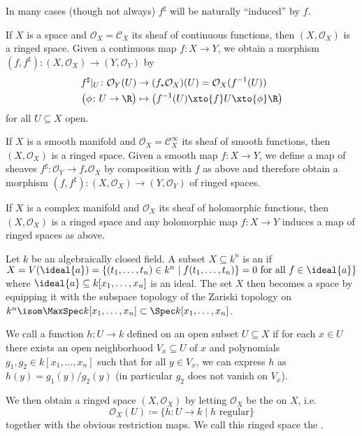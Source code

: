 \documentclass[wip, algebra]{bsteffan-lecturenotes}
\newcommand{\cO}{\mathcal{O}}
\newcommand{\cC}{\mathcal{C}}
\begin{document}
In many cases (though not always) $f^\sharp$ will be naturally \enquote{induced} by $f$.
\begin{example}\label{epl:sch:examples}
	\leavevmode
	\begin{alphanumerate}
		\item If $X$ is a space and $\cO_X = \cC_X$ its sheaf of continuous functions, then $(X, \cO_X)$ is a ringed space.
			Given a continuous map $f\colon X \to Y$, we obtain a morphism $(f, f^\sharp)\colon (X, \cO_X) \to (Y, \cO_Y)$ by 
			\begin{align*}
				f^\sharp|_U\colon \cO_Y(U) &\to (f_* \cO_X)(U) = \cO_X(f^{-1}(U)) \\
					\big(\phi\colon U \to \R\big) &\mapsto \big(f^{-1}(U) \xto{f} U \xto{\phi} \R\big)
			\end{align*}
			for all $U \subseteq X$ open.
		\item If $X$ is a smooth manifold and $\cO_X = \cC_X^\infty$ its sheaf of smooth functions, then $(X, \cO_X)$ is a ringed space.
			Given a smooth map $f\colon X \to Y$, we define a map of sheaves $f^\sharp\colon \cO_Y \to f_* \cO_X$ by composition with $f$ as above and therefore obtain a morphism $(f, f^\sharp)\colon (X, \cO_X) \to (Y, \cO_Y)$ of ringed spaces.
		\item If $X$ is a complex manifold and $\cO_X$ its sheaf of holomorphic functions, then $(X, \cO_X)$ is a ringed space and any holomorphic map $f\colon X \to Y$ induces a map of ringed spaces as above.
		\item Let $k$ be an algebraically closed field.
			A subset $X \subseteq k^n$ is an  if $X = V(\ideal{a}) = \{(t_1, \ldots, t_n) \in k^n \mid f(t_1, \ldots, t_n)\} = 0 \text{ for all } f \in \ideal{a}\}$ where $\ideal{a} \subseteq k[x_1, \ldots, x_n]$ is an ideal.
			The set $X$ then becomes a space by equipping it with the subspace topology of the Zariski topology on $k^n \isom \MaxSpec k[x_1, \ldots, x_n] \subset \Spec k[x_1, \ldots, x_n]$.

			We call a function $h\colon U \to k$ defined on an open subset $U \subseteq X$  if for each $x \in U$ there exists an open neighborhood $V_x \subseteq U$ of $x$ and polynomials $g_1, g_2 \in k[x_1, \ldots, x_n]$ such that for all $y \in V_x$, we can express $h$ as $h(y) = g_1(y) / g_2(y)$ (in particular $g_2$ does not vanish on $V_x$).

			We then obtain a ringed space $(X, \cO_X)$ by letting $\cO_X$ be the  on $X$, i.e.
			\begin{equation*}
				\cO_X(U) \coloneq \{h\colon U \to k \mid h \text{ regular}\}
			\end{equation*}
			together with the obvious restriction maps.
			We call this ringed space the .
	\end{alphanumerate}
\end{example}
\end{document}
